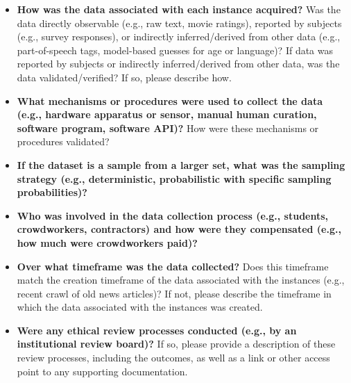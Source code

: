 \begin{itemize}

\item \textbf{How was the data associated with each instance
    acquired?} Was the data directly observable (e.g., raw text, movie
  ratings), reported by subjects (e.g., survey responses), or
  indirectly inferred/derived from other data (e.g., part-of-speech
  tags, model-based guesses for age or language)? If  data was reported
  by subjects or indirectly inferred/derived from other data, was the
  data validated/verified? If so, please describe how.

\item \textbf{What mechanisms or procedures were used to collect the
    data (e.g., hardware apparatus or sensor, manual human
    curation, software program, software API)?} How were these
    mechanisms or procedures validated?

\item \textbf{If the dataset is a sample from a larger set, what was
    the sampling strategy (e.g., deterministic, probabilistic with
    specific sampling probabilities)?}

\item \textbf{Who was involved in the data collection process (e.g.,
    students, crowdworkers, contractors) and how were they compensated
    (e.g., how much were crowdworkers paid)?}

\item \textbf{Over what timeframe was the data collected?} Does this
  timeframe match the creation timeframe of the data associated with
  the instances (e.g., recent crawl of old news articles)?  If not,
  please describe the timeframe in which the data associated with the
  instances was created.

\item \textbf{Were any ethical review processes conducted (e.g., by an
    institutional review board)?} If so, please provide a description
  of these review processes, including the outcomes, as well as a link
  or other access point to any supporting documentation.

\end{itemize}


